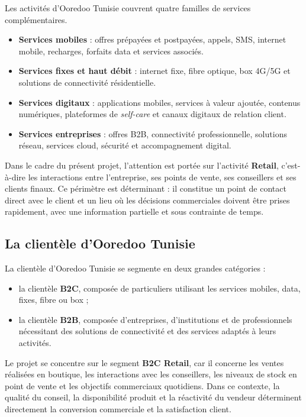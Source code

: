Les activités d'Ooredoo Tunisie couvrent quatre familles de services complémentaires.

\begin{itemize}[label=--]
    \item \textbf{Services mobiles} : offres prépayées et postpayées, appels, SMS, internet mobile, recharges, forfaits data et services associés.
    \item \textbf{Services fixes et haut débit} : internet fixe, fibre optique, box 4G/5G et solutions de connectivité résidentielle.
    \item \textbf{Services digitaux} : applications mobiles, services à valeur ajoutée, contenus numériques, plateformes de \textit{self-care} et canaux digitaux de relation client.
    \item \textbf{Services entreprises} : offres B2B, connectivité professionnelle, solutions réseau, services cloud, sécurité et accompagnement digital.
\end{itemize}

Dans le cadre du présent projet, l'attention est portée sur l'activité \textbf{Retail}, c'est-à-dire les interactions entre l'entreprise, ses points de vente, ses conseillers et ses clients finaux. Ce périmètre est déterminant : il constitue un point de contact direct avec le client et un lieu où les décisions commerciales doivent être prises rapidement, avec une information partielle et sous contrainte de temps.

\subsection{La clientèle d'Ooredoo Tunisie}

La clientèle d'Ooredoo Tunisie se segmente en deux grandes catégories :

\begin{itemize}[label=--]
    \item la clientèle \textbf{B2C}, composée de particuliers utilisant les services mobiles, data, fixes, fibre ou box ;
    \item la clientèle \textbf{B2B}, composée d'entreprises, d'institutions et de professionnels nécessitant des solutions de connectivité et des services adaptés à leurs activités.
\end{itemize}

Le projet se concentre sur le segment \textbf{B2C Retail}, car il concerne les ventes réalisées en boutique, les interactions avec les conseillers, les niveaux de stock en point de vente et les objectifs commerciaux quotidiens. Dans ce contexte, la qualité du conseil, la disponibilité produit et la réactivité du vendeur déterminent directement la conversion commerciale et la satisfaction client.

